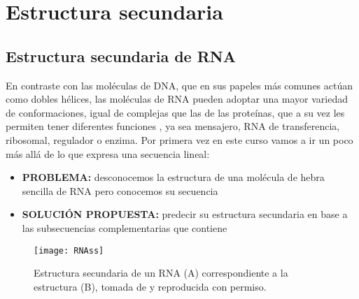 \chapter{Estructura secundaria} \label{ss}


\section{Estructura secundaria de RNA} \label{SSRNA}

En contraste con las mol\'{e}culas de DNA, que en sus papeles m\'{a}s comunes act\'{u}an como dobles h\'{e}lices,
las mol\'{e}culas de RNA pueden adoptar una mayor variedad de conformaciones, igual de complejas que las de
las prote\'{i}nas, que a su vez les permiten tener diferentes funciones , ya sea mensajero, RNA de transferencia,
ribosomal, regulador o enzima. Por primera vez en este curso vamos a ir un poco m\'{a}s all\'{a} de lo que expresa
una secuencia lineal:

\begin{itemize}
\item \textbf{PROBLEMA:} desconocemos la estructura de una mol\'{e}cula de hebra sencilla de RNA pero conocemos su secuencia
\item \textbf{SOLUCI\'{O}N PROPUESTA:} predecir su estructura secundaria en base a las subsecuencias complementarias que contiene
\end{itemize}

\begin{figure}
\begin{center} 
\texttt{[image: RNAss]}
\caption%
{
Estructura secundaria de un RNA (A) correspondiente a la estructura (B), tomada de \cite{Noller2004} y reproducida con permiso.
}
\label{fig:RNAss}
\end{center}
\end{figure}

